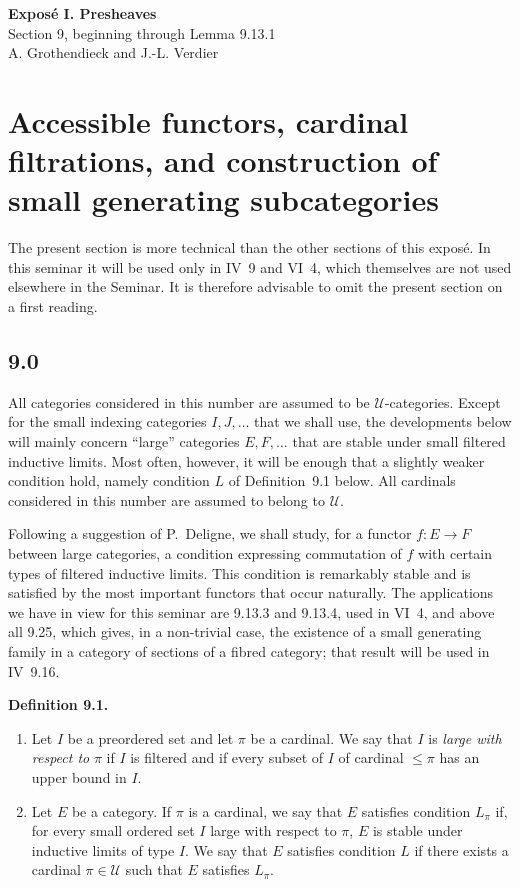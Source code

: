 \documentclass[11pt]{article}
\newcommand{\U}{\mathcal{U}}
\newenvironment{statement}[1]{\par\medskip\noindent\textbf{#1.}\ }{\par\medskip}
\begin{document}
\begin{center}
{\Large \textbf{Expos\'e I. Presheaves}}\\[0.35em]
{\large Section 9, beginning through Lemma 9.13.1}\\[0.35em]
A. Grothendieck and J.-L. Verdier
\end{center}

\bigskip


\setcounter{section}{8}
\section{Accessible functors, cardinal filtrations, and construction of small generating subcategories}

The present section is more technical than the other sections of this expos\'e. In this seminar it will be used only in IV~9 and VI~4, which themselves are not used elsewhere in the Seminar. It is therefore advisable to omit the present section on a first reading.

\subsection*{9.0}
All categories considered in this number are assumed to be $\U$-categories. Except for the small indexing categories $I,J,\ldots$ that we shall use, the developments below will mainly concern ``large'' categories $E,F,\ldots$ that are stable under small filtered inductive limits. Most often, however, it will be enough that a slightly weaker condition hold, namely condition $L$ of Definition~9.1 below. All cardinals considered in this number are assumed to belong to $\U$.

Following a suggestion of P.~Deligne, we shall study, for a functor $f:E\to F$ between large categories, a condition expressing commutation of $f$ with certain types of filtered inductive limits. This condition is remarkably stable and is satisfied by the most important functors that occur naturally. The applications we have in view for this seminar are 9.13.3 and 9.13.4, used in VI~4, and above all 9.25, which gives, in a non-trivial case, the existence of a small generating family in a category of sections of a fibred category; that result will be used in IV~9.16.

\begin{statement}{Definition 9.1}
\begin{enumerate}[label=\alph*)]
\item Let $I$ be a preordered set and let $\pi$ be a cardinal. We say that $I$ is \emph{large with respect to} $\pi$ if $I$ is filtered and if every subset of $I$ of cardinal $\leq \pi$ has an upper bound in $I$.

\item Let $E$ be a category. If $\pi$ is a cardinal, we say that $E$ satisfies condition $L_\pi$ if, for every small ordered set $I$ large with respect to $\pi$, $E$ is stable under inductive limits of type $I$. We say that $E$ satisfies condition $L$ if there exists a cardinal $\pi\in\U$ such that $E$ satisfies $L_\pi$.
\end{enumerate}
\end{statement}
\end{document}
